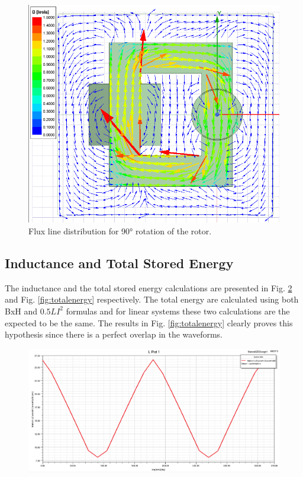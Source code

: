 \documentclass{article}
\begin{document}
\begin{figure}[H]
	\centering
	\includegraphics[width=1\linewidth]{Figurler/Q2/90degrees_linear}
	\caption{Flux line distribution for \ang{90} rotation of the rotor.}
	\label{fig:90degreeslinear}
\end{figure}
\subsection{Inductance and Total Stored Energy}
The inductance and the total stored energy calculations are presented in Fig. \ref{fig:degreesinductance} and Fig. \ref{fig:totalenergy} respectively. The total energy are calculated using both BxH and $0.5LI^2$ formulas and for linear systems these two calculations are the expected to be the same. The results in Fig. \ref{fig:totalenergy} clearly proves this hypothesis since there is a perfect overlap in the waveforms.

\begin{figure}[H]
	\centering
	\includegraphics[width=1\linewidth]{Figurler/Q2/degrees_inductance}
	\caption{}
	\label{fig:degreesinductance}
\end{figure}
\end{document}
